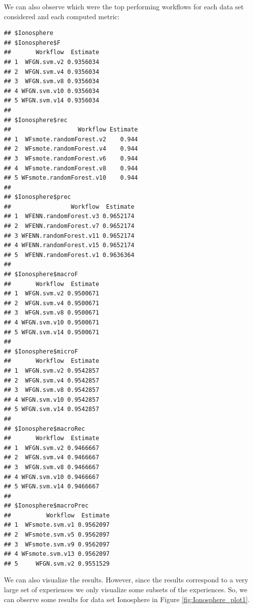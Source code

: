 \documentclass[10pt,a4paper]{article}\usepackage[]{graphicx}\usepackage[]{color}
\makeatletter
\newenvironment{kframe}{%
 \def\at@end@of@kframe{}%
 \ifinner\ifhmode%
  \def\at@end@of@kframe{\end{minipage}}%
  \begin{minipage}{\columnwidth}%
 \fi\fi%
 \def\FrameCommand##1{\hskip\@totalleftmargin \hskip-\fboxsep
 \colorbox{shadecolor}{##1}\hskip-\fboxsep
     \hskip-\linewidth \hskip-\@totalleftmargin \hskip\columnwidth}%
 \MakeFramed {\advance\hsize-\width
   \@totalleftmargin\z@ \linewidth\hsize
   \@setminipage}}%
 {\par\unskip\endMakeFramed%
 \at@end@of@kframe}
\newenvironment{knitrout}{}{} %
\makeatother
\begin{document}
We can also observe which were the top performing workflows for each data set considered and each computed metric:
\begin{knitrout}\footnotesize
{}\color{fgcolor}\begin{kframe}
\begin{verbatim}
## $Ionosphere
## $Ionosphere$F
##       Workflow  Estimate
## 1  WFGN.svm.v2 0.9356034
## 2  WFGN.svm.v4 0.9356034
## 3  WFGN.svm.v8 0.9356034
## 4 WFGN.svm.v10 0.9356034
## 5 WFGN.svm.v14 0.9356034
## 
## $Ionosphere$rec
##                   Workflow Estimate
## 1  WFsmote.randomForest.v2    0.944
## 2  WFsmote.randomForest.v4    0.944
## 3  WFsmote.randomForest.v6    0.944
## 4  WFsmote.randomForest.v8    0.944
## 5 WFsmote.randomForest.v10    0.944
## 
## $Ionosphere$prec
##                 Workflow  Estimate
## 1  WFENN.randomForest.v3 0.9652174
## 2  WFENN.randomForest.v7 0.9652174
## 3 WFENN.randomForest.v11 0.9652174
## 4 WFENN.randomForest.v15 0.9652174
## 5  WFENN.randomForest.v1 0.9636364
## 
## $Ionosphere$macroF
##       Workflow  Estimate
## 1  WFGN.svm.v2 0.9500671
## 2  WFGN.svm.v4 0.9500671
## 3  WFGN.svm.v8 0.9500671
## 4 WFGN.svm.v10 0.9500671
## 5 WFGN.svm.v14 0.9500671
## 
## $Ionosphere$microF
##       Workflow  Estimate
## 1  WFGN.svm.v2 0.9542857
## 2  WFGN.svm.v4 0.9542857
## 3  WFGN.svm.v8 0.9542857
## 4 WFGN.svm.v10 0.9542857
## 5 WFGN.svm.v14 0.9542857
## 
## $Ionosphere$macroRec
##       Workflow  Estimate
## 1  WFGN.svm.v2 0.9466667
## 2  WFGN.svm.v4 0.9466667
## 3  WFGN.svm.v8 0.9466667
## 4 WFGN.svm.v10 0.9466667
## 5 WFGN.svm.v14 0.9466667
## 
## $Ionosphere$macroPrec
##          Workflow  Estimate
## 1  WFsmote.svm.v1 0.9562097
## 2  WFsmote.svm.v5 0.9562097
## 3  WFsmote.svm.v9 0.9562097
## 4 WFsmote.svm.v13 0.9562097
## 5     WFGN.svm.v2 0.9551529
\end{verbatim}
\end{kframe}
\end{knitrout}

We can also visualize the results. However, since the results correspond to a very large set of experiences we only visualize some subsets of the experiences. So, we can observe some results for data set Ionosphere in Figure \ref{fig:Ionosphere_plot1}.
\end{document}

